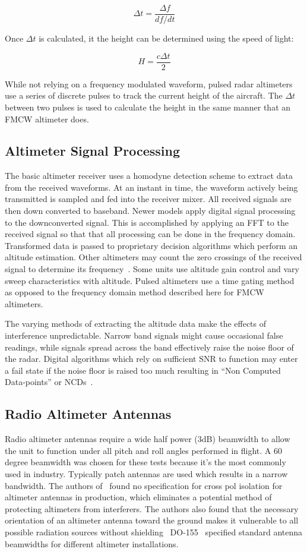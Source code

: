 $$\Delta t = \frac{\Delta f}{df/dt}$$

Once $\Delta t$ is calculated, it the height can be determined using the speed of light: 

$$H = \frac{c\Delta t}{2} $$

While not relying on a frequency modulated waveform, pulsed radar altimeters use a series of discrete pulses to track the current height of the aircraft. The $\Delta t$ between two pulses is used to calculate the height in the same manner that an FMCW altimeter does. 

\subsection{Altimeter Signal Processing}
The basic altimeter receiver uses a homodyne detection scheme to extract data from the received waveforms. At an instant in time, the waveform actively being transmitted is sampled and fed into the receiver mixer. All received signals are then down converted to baseband. Newer models apply digital signal processing to the downconverted signal. This is accomplished by applying an FFT to the received signal so that that all processing can be done in the frequency domain. Transformed data is passed to proprietary decision algorithms which perform an altitude estimation. Other altimeters may count the zero crossings of the received signal to determine its frequency~\cite{noauthor_operational_2014}. Some units use altitude gain control and vary sweep characteristics with altitude. Pulsed altimeters use a time gating method as opposed to the frequency domain method described here for FMCW altimeters. 

The varying methods of extracting the altitude data make the effects of interference unpredictable. Narrow band signals might cause occasional false readings, while signals spread across the band effectively raise the noise floor of the radar. Digital algorithms which rely on sufficient SNR to function may enter a fail state if the noise floor is raised too much resulting in ``Non Computed Data-points'' or NCDs~\cite{noauthor_operational_2014}.

\subsection{Radio Altimeter Antennas}
Radio altimeter antennas require a wide half power (3dB) beamwidth to allow the unit to function under all pitch and roll angles performed in flight. A 60 degree beamwidth was chosen for these tests because it's the most commonly used in industry. Typically patch antennas are used which results in a narrow bandwidth. The authors of~\cite{noauthor_operational_2014} found no specification for cross pol isolation for altimeter antennas in production, which eliminates a potential method of protecting altimeters from interferers. The authors also found that the necessary orientation of an altimeter antenna toward the ground makes it vulnerable to all possible radiation sources without shielding~\cite{noauthor_operational_2014} DO-155~\cite{noauthor_minimum_1974} specified standard antenna beamwidths for different altimeter installations. 

